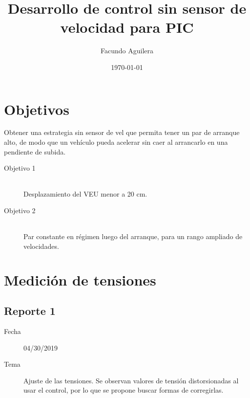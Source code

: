 \documentclass{article}
\title{Desarrollo de control sin sensor de velocidad para PIC} %
\author{Facundo Aguilera} %
\date{\today} %
\begin{document}
	
	\maketitle 
	

	
	
	\section{Objetivos}
	

	
	
	Obtener una estrategia sin sensor de vel que permita tener un par de arranque alto, de modo que un vehículo pueda acelerar sin caer al arrancarlo en una pendiente de subida.
	
	
	\begin{description}
	\item[Objetivo 1] \hfill \\
	Desplazamiento del VEU menor a 20 cm.
	\item[Objetivo 2] \hfill \\
	Par constante en régimen luego del arranque, para un rango ampliado de velocidades.
	\end{description}
	

	
	
	\section{Medición de tensiones}
	
	
		\subsection{Reporte 1}
			\begin{description}
				\item[Fecha]  04/30/2019 
				\item[Tema] Ajuste de las tensiones. Se observan valores de tensión distorsionadas al usar el control, por lo que se propone buscar formas de corregirlas.
			\end{description}
		
\end{document}
